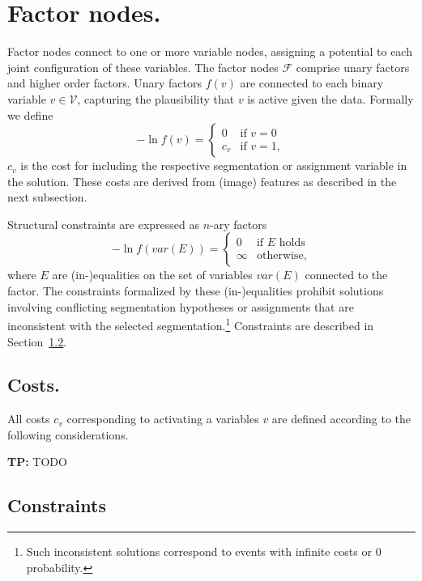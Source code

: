 \documentclass[a4paper]{article}
\newcommand{\TP}[1]{{\color{Red}\sc \textbf{TP:} #1}{}}
\newcommand{\FGV}{\ensuremath{\mathcal{V}}\xspace}
\newcommand{\FGF}{\ensuremath{\mathcal{F}}\xspace}
\begin{document}
\section{Factor nodes.}
%
%
Factor nodes connect to one or more variable nodes, assigning a potential to each joint configuration of these variables.
The factor nodes \FGF comprise unary factors and higher order factors.
Unary factors $f(v)$ are connected to each binary variable $v \in \FGV$, capturing the plausibility that $v$ is active given the data. Formally we define
\begin{equation}
  -\ln f(v) = \begin{cases}
    0    & \text{if } v = 0 \\
    c_v  & \text{if } v = 1,
  \end{cases}
\end{equation}
$c_{v}$ is the cost for including the respective segmentation or assignment variable in the solution.
These costs are derived from (image) features as described in the next subsection.

Structural constraints are expressed as $n$-ary factors
\begin{equation}
  -\ln f(var(E)) = \begin{cases}
    0    & \text{if $E$ holds} \\
    \infty & \text{otherwise,}
  \end{cases}
\end{equation}
where $E$ are (in-)equalities on the set of variables $var(E)$ connected to the factor.
The constraints formalized by these (in-)equalities prohibit
  solutions involving conflicting segmentation hypotheses or assignments that are inconsistent with the selected segmentation.\footnote{%
  Such inconsistent solutions correspond to events with infinite costs or $0$ probability.}
Constraints are described in Section~\ref{sec:constraints}.


%
%
\subsection{Costs.}
\label{sec:segcosts}
%
%
All costs $c_v$ corresponding to activating a variables $v$ are defined according to the following considerations.

\TP{TODO}

\subsection{Constraints}
\label{sec:constraints}
%
%
\end{document}
